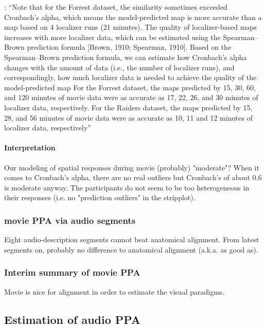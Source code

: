 %
\citep{feilong2022individualized}: ``Note that for the Forrest dataset, the
similarity sometimes exceeded Cronbach's alpha, which means the model-predicted
map is more accurate than a map based on 4 localizer runs (21 minutes).
%
The quality of localizer-based maps increases with more localizer data, which
can be estimated using the Spearman–Brown prediction formula [Brown, 1910;
Spearman, 1910].
%
Based on the Spearman–Brown prediction formula, we can estimate how Cronbach's
alpha changes with the amount of data (i.e., the number of localizer runs), and
correspondingly, how much localizer data is needed to achieve the quality of the
model-predicted map
%
For the Forrest dataset, the maps predicted by 15, 30, 60, and 120 minutes of
movie data were as accurate as 17, 22, 26, and 30 minutes of localizer data,
respectively.
%
For the Raiders dataset, the maps predicted by 15, 28, and 56 minutes of movie
data were as accurate as 10, 11 and 12 minutes of localizer data, respectively''
\citep{feilong2022individualized}

\paragraph{Interpretation}
%
Our modeling of spatial responses during movie (probably) "moderate"?
%
When it comes to Cronbach's alpha, there are no real outliers but Cronbach's of
about 0.6 is moderate anyway.
%
The participants do not seem to be too heterogeneous in their responses (i.e.
no "prediction outliers" in the stripplot).



\subsubsection{movie PPA via audio segments}


%
Eight audio-description segments cannot beat anatomical alignment.
%
From latest segments on, probably no difference to anatomical alignment (a.k.a.
as good as).


\subsubsection{Interim summary of movie PPA}

Movie is nice for alignment in order to estimate the visual paradigms.



\subsection{Estimation of audio PPA}

